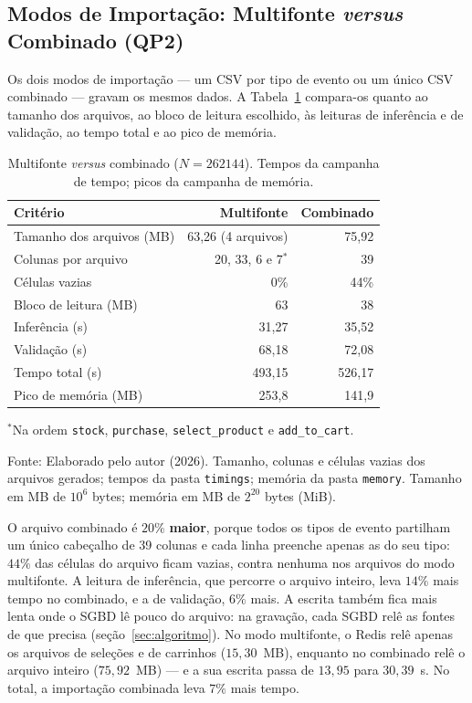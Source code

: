 \subsection{Modos de Importação: Multifonte \textit{versus} Combinado (QP2)}
\label{sec:res-modos}

Os dois modos de importação --- um CSV por tipo de evento ou um único CSV combinado ---
gravam os mesmos dados. A Tabela~\ref{tab:multi-combined} compara-os quanto ao tamanho dos
arquivos, ao bloco de leitura escolhido, às leituras de inferência e de validação, ao tempo
total e ao pico de memória.

\begin{table}[H]
  \caption{Multifonte \textit{versus} combinado ($N = \num{262144}$). Tempos da campanha de tempo; picos da campanha de memória.}
  \label{tab:multi-combined}
  \centering
  \begin{tabular}{l r r}
    \toprule
    \textbf{Critério} & \textbf{Multifonte} & \textbf{Combinado} \\
    \midrule
    Tamanho dos arquivos (MB)  & 63{,}26 (4 arquivos) & 75{,}92 \\
    Colunas por arquivo        & 20, 33, 6 e 7$^{*}$ & 39 \\
    Células vazias             & 0\%      & 44\% \\
    Bloco de leitura (MB)      & 63       & 38 \\
    Inferência (s)             & 31{,}27  & 35{,}52 \\
    Validação (s)              & 68{,}18  & 72{,}08 \\
    Tempo total (s)            & 493{,}15 & 526{,}17 \\
    Pico de memória (MB)       & 253{,}8   & 141{,}9 \\
    \bottomrule
  \end{tabular}
  \par\vspace{4pt}
  {\footnotesize $^{*}$Na ordem \texttt{stock}, \texttt{purchase}, \texttt{select\_product} e \texttt{add\_to\_cart}.\par
  Fonte: Elaborado pelo autor (2026). Tamanho, colunas e células vazias dos arquivos gerados; tempos da pasta \texttt{timings}; memória da pasta \texttt{memory}. Tamanho em MB de $10^6$ bytes; memória em MB de $2^{20}$ bytes (MiB).}
\end{table}

O arquivo combinado é $20\%$ \textbf{maior}, porque todos os tipos de evento partilham um
único cabeçalho de 39 colunas e cada linha preenche apenas as do seu tipo: $44\%$ das
células do arquivo ficam vazias, contra nenhuma nos arquivos do modo multifonte. A leitura
de inferência, que percorre o arquivo inteiro, leva $14\%$ mais tempo no combinado, e a de
validação, $6\%$ mais. A escrita também fica mais lenta onde o SGBD lê pouco do
arquivo: na gravação, cada SGBD relê as fontes de que precisa (seção~\ref{sec:algoritmo}).
No modo multifonte, o Redis relê apenas os arquivos de seleções e de carrinhos ($15{,}30$~MB),
enquanto no combinado relê o arquivo inteiro ($75{,}92$~MB) --- e a sua escrita passa de
$13{,}95$ para $30{,}39$~s. No total, a importação combinada leva $7\%$ mais tempo.

